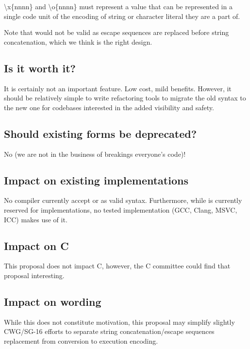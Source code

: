 \documentclass{wg21}
\begin{document}
    \textbackslash x\{nnnn\} and \textbackslash o\{nnnn\} must represent a value that can be represented in a single code unit of the encoding of string or character literal they are a part of.
    
    Note that  would not be valid as escape sequences are replaced before string concatenation, which we think is the right design.
    
    
    \subsection{Is it worth it?}
    
    It is certainly not an important feature. Low cost, mild benefits.
    However, it should be relatively simple to write refactoring tools to migrate the old syntax to the new one for codebases interested in the added visibility and safety.
    
    
    \subsection{Should existing forms be deprecated?}
    
    No (we are not in the business of breakings everyone's code)!
    
    \subsection{Impact on existing implementations}
    
    No compiler currently accept  or  as valid syntax.
    Furthermore, while  is currently reserved for implementations, no tested implementation (GCC, Clang, MSVC, ICC) makes use of it.
    
    
    \subsection{Impact on C}
    
    This proposal does not impact C, however, the C committee could find that proposal interesting.
    
    
    \subsection{Impact on wording}
    
    While this does not constitute motivation, this proposal may simplify slightly CWG/SG-16 efforts to separate string concatenation/escape sequences replacement from
    conversion to execution encoding.
    
\end{document}
